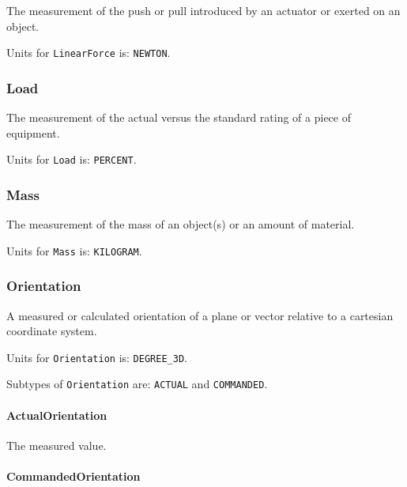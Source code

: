 The measurement of the push or pull introduced by an actuator or exerted on an object.


Units for \texttt{LinearForce} is: \texttt{NEWTON}.

\FloatBarrier

\subsubsection{Load}
\label{sec:Load}



The measurement of the actual versus the standard rating of a piece of equipment.


Units for \texttt{Load} is: \texttt{PERCENT}.

\FloatBarrier

\subsubsection{Mass}
\label{sec:Mass}



The measurement of the mass of an object(s) or an amount of material.


Units for \texttt{Mass} is: \texttt{KILOGRAM}.

\FloatBarrier

\subsubsection{Orientation}
\label{sec:Orientation}



A measured or calculated orientation of a plane or vector relative to a cartesian coordinate system.


Units for \texttt{Orientation} is: \texttt{DEGREE_3D}.


Subtypes of \texttt{Orientation} are: \texttt{ACTUAL} and \texttt{COMMANDED}. 
\FloatBarrier

\paragraph{ActualOrientation}\mbox{}
\label{sec:ActualOrientation}



The measured value.


\paragraph{CommandedOrientation}\mbox{}
\label{sec:CommandedOrientation}



